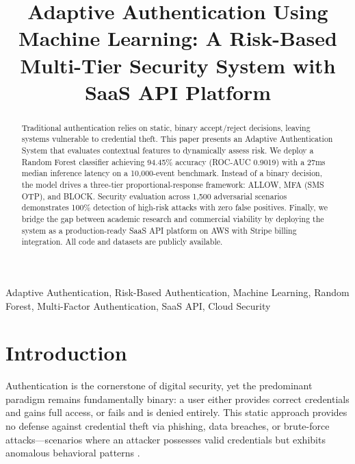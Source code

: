 \documentclass[conference]{IEEEtran}
\begin{document}
\title{Adaptive Authentication Using Machine Learning: A Risk-Based Multi-Tier Security System with SaaS API Platform}

\author{
}

\maketitle

\begin{abstract}
Traditional authentication relies on static, binary accept/reject decisions, leaving systems vulnerable to credential theft. This paper presents an Adaptive Authentication System that evaluates contextual features to dynamically assess risk. We deploy a Random Forest classifier achieving 94.45\% accuracy (ROC-AUC 0.9019) with a 27ms median inference latency on a 10,000-event benchmark. Instead of a binary decision, the model drives a three-tier proportional-response framework: ALLOW, MFA (SMS OTP), and BLOCK. Security evaluation across 1,500 adversarial scenarios demonstrates 100\% detection of high-risk attacks with zero false positives. Finally, we bridge the gap between academic research and commercial viability by deploying the system as a production-ready SaaS API platform on AWS with Stripe billing integration. All code and datasets are publicly available.
\end{abstract}

\begin{IEEEkeywords}
Adaptive Authentication, Risk-Based Authentication, Machine Learning, Random Forest, Multi-Factor Authentication, SaaS API, Cloud Security
\end{IEEEkeywords}

\section{Introduction}

Authentication is the cornerstone of digital security, yet the predominant paradigm remains fundamentally binary: a user either provides correct credentials and gains full access, or fails and is denied entirely. This static approach provides no defense against credential theft via phishing, data breaches, or brute-force attacks---scenarios where an attacker possesses valid credentials but exhibits anomalous behavioral patterns \cite{freeman2016}.
\end{document}
